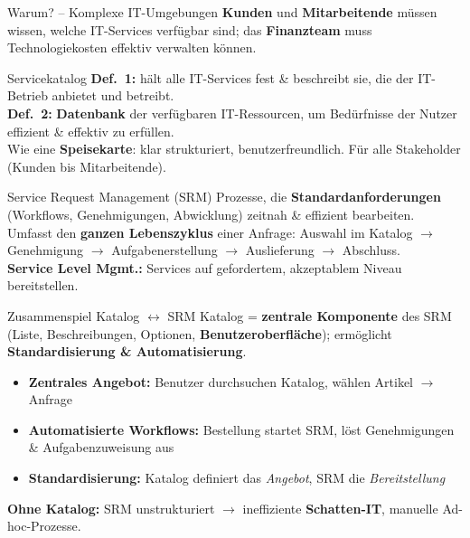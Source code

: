 \documentclass[a4paper, fontsize=7pt]{scrartcl}
\begin{document}
\begin{subbox}{Warum? -- Komplexe IT-Umgebungen}
\textbf{Kunden} und \textbf{Mitarbeitende} müssen wissen, welche IT-Services
verfügbar sind; das \textbf{Finanzteam} muss Technologiekosten effektiv
verwalten können.
\end{subbox}

\begin{mainbox}{Servicekatalog}
\textbf{Def.\ 1:} hält alle IT-Services fest \& beschreibt sie, die der
IT-Betrieb anbietet und betreibt.\\
\textbf{Def.\ 2:} \textbf{Datenbank} der verfügbaren IT-Ressourcen, um
Bedürfnisse der Nutzer effizient \& effektiv zu erfüllen.\\
Wie eine \textbf{Speisekarte}: klar strukturiert, benutzerfreundlich.
Für alle Stakeholder (Kunden bis Mitarbeitende).
\end{mainbox}

\begin{mainbox}{Service Request Management (SRM)}
Prozesse, die \textbf{Standardanforderungen} (Workflows, Genehmigungen,
Abwicklung) zeitnah \& effizient bearbeiten. Umfasst den
\textbf{ganzen Lebenszyklus} einer Anfrage: Auswahl im Katalog
$\to$ Genehmigung $\to$ Aufgabenerstellung $\to$ Auslieferung $\to$
Abschluss.\\
\textbf{Service Level Mgmt.:} Services auf gefordertem, akzeptablem
Niveau bereitstellen.
\end{mainbox}

\begin{mainbox}{Zusammenspiel Katalog $\leftrightarrow$ SRM}
Katalog = \textbf{zentrale Komponente} des SRM (Liste, Beschreibungen,
Optionen, \textbf{Benutzeroberfläche}); ermöglicht
\textbf{Standardisierung \& Automatisierung}.
\begin{itemize}
    \item \textbf{Zentrales Angebot:} Benutzer durchsuchen Katalog,
          wählen Artikel $\to$ Anfrage
    \item \textbf{Automatisierte Workflows:} Bestellung startet SRM,
          löst Genehmigungen \& Aufgabenzuweisung aus
    \item \textbf{Standardisierung:} Katalog definiert das
          \emph{Angebot}, SRM die \emph{Bereitstellung}
\end{itemize}
\textbf{Ohne Katalog:} SRM unstrukturiert $\to$ ineffiziente
\textbf{Schatten-IT}, manuelle Ad-hoc-Prozesse.
\end{mainbox}
\end{document}
